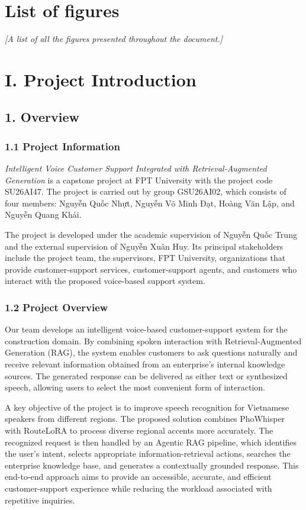 \documentclass[11pt,a4paper]{article}
\makeatletter
\newcommand{\guidance}[1]{%
  {\color{guidanceblue}\itshape [#1]\par}%
}
\newcommand{\chapterstart}[1]{\clearpage\section{#1}}
\newcommand{\vietnamesetext}[1]{{\fontencoding{T5}\fontfamily{qtm}\selectfont #1}}
\newcommand{\printlistoffigures}{\@starttoc{lof}}
\newcommand{\ProjectName}{Intelligent Voice Customer Support Integrated with Retrieval-Augmented Generation}
\newcommand{\GroupName}{GSU26AI02}
\newcommand{\MemberOneName}{\vietnamesetext{Nguyễn Quốc Nhựt}}
\newcommand{\MemberTwoName}{\vietnamesetext{Nguyễn Võ Minh Đạt}}
\newcommand{\MemberThreeName}{\vietnamesetext{Hoàng Văn Lập}}
\newcommand{\MemberFourName}{\vietnamesetext{Nguyễn Quang Khải}}
\newcommand{\SupervisorName}{\vietnamesetext{Nguyễn Quốc Trung}}
\newcommand{\ExternalSupervisorName}{\vietnamesetext{Nguyễn Xuân Huy}}
\newcommand{\CapstoneCode}{SU26AI47}
\makeatother
\begin{document}
\section{List of figures}
\guidance{A list of all the figures presented throughout the document.}
\printlistoffigures

\clearpage
{}
\chapterstart{I. Project Introduction}

\subsection{1. Overview}

\subsubsection{1.1 Project Information}

\textit{\ProjectName} is a capstone project at FPT University with the project
code \CapstoneCode. The project is carried out by group \GroupName, which
consists of four members: \MemberOneName, \MemberTwoName, \MemberThreeName,
and \MemberFourName.

The project is developed under the academic supervision of \SupervisorName{}
and the external supervision of \ExternalSupervisorName. Its principal
stakeholders include the project team, the supervisors, FPT University,
organizations that provide customer-support services, customer-support agents,
and customers who interact with the proposed voice-based support system.

\subsubsection{1.2 Project Overview}

Our team develops an intelligent voice-based customer-support system for the construction domain. By combining spoken interaction with Retrieval-Augmented Generation (RAG), the system enables customers to ask questions naturally and receive relevant information obtained from an enterprise's internal knowledge sources. The generated response can be delivered as either text or synthesized speech, allowing users to select the most convenient form of interaction.

A key objective of the project is to improve speech recognition for Vietnamese
speakers from different regions. The proposed solution combines PhoWhisper with
RouteLoRA to process diverse regional accents more accurately. The recognized
request is then handled by an Agentic RAG pipeline, which identifies the user's
intent, selects appropriate information-retrieval actions, searches the
enterprise knowledge base, and generates a contextually grounded response.
This end-to-end approach aims to provide an accessible, accurate, and efficient
customer-support experience while reducing the workload associated with
repetitive inquiries.
\end{document}
